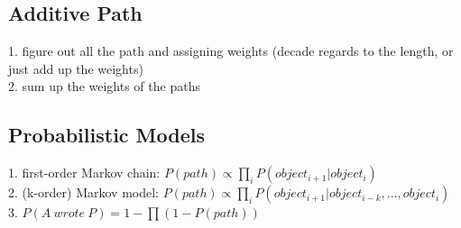 \documentclass[12pt,a4paper]{article}
\begin{document}
\subsection{Additive Path}
1. figure out all the path and assigning weights (decade regards to the length, or just add up the weights)\\
2. sum up the weights of the paths

\subsection{Probabilistic Models}
1. first-order Markov chain: $P(path) \propto \prod_i P(object_{i+1}|object_{i})$\\
2. (k-order) Markov model: $P(path) \propto \prod_i P(object_{i+1}|object_{i-k}, ..., object_i)$\\
3. $P(A\ wrote\ P) = 1 - \prod (1 - P(path))$
\end{document}

